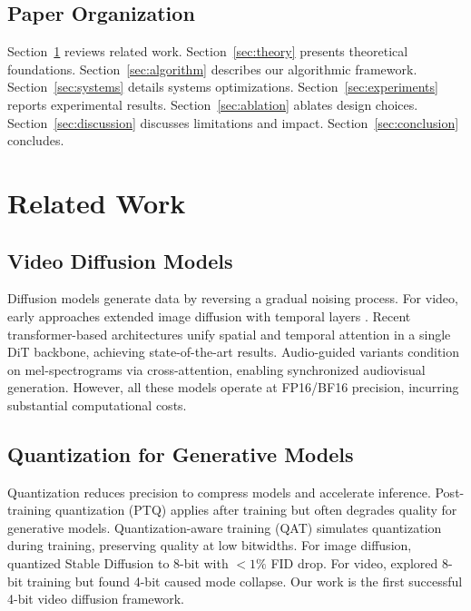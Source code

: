 \documentclass[journal]{IEEEtran}
\theoremstyle{definition}
\theoremstyle{remark}
\begin{document}
\subsection{Paper Organization}
Section~\ref{sec:related} reviews related work. Section~\ref{sec:theory} presents theoretical foundations. Section~\ref{sec:algorithm} describes our algorithmic framework. Section~\ref{sec:systems} details systems optimizations. Section~\ref{sec:experiments} reports experimental results. Section~\ref{sec:ablation} ablates design choices. Section~\ref{sec:discussion} discusses limitations and impact. Section~\ref{sec:conclusion} concludes.

\section{Related Work}
\label{sec:related}

\subsection{Video Diffusion Models}
Diffusion models \cite{ho2020denoising, song2021denoising} generate data by reversing a gradual noising process. For video, early approaches extended image diffusion with temporal layers \cite{ho2022video, yang2022latent}. Recent transformer-based architectures \cite{peebles2023scalable, ma2024latte} unify spatial and temporal attention in a single DiT backbone, achieving state-of-the-art results. Audio-guided variants \cite{zhu2023tune, guo2024audio} condition on mel-spectrograms via cross-attention, enabling synchronized audiovisual generation. However, all these models operate at FP16/BF16 precision, incurring substantial computational costs.

\subsection{Quantization for Generative Models}
Quantization reduces precision to compress models and accelerate inference. Post-training quantization (PTQ) \cite{bondarenko2024understanding, xiao2023smoothquant} applies after training but often degrades quality for generative models. Quantization-aware training (QAT) \cite{esser2020learned, liu2020lsq} simulates quantization during training, preserving quality at low bitwidths. For image diffusion, \cite{li2023efficientdm} quantized Stable Diffusion to 8-bit with $<1\%$ FID drop. For video, \cite{zhang2024videoquant} explored 8-bit training but found 4-bit caused mode collapse. Our work is the first successful 4-bit video diffusion framework.
\end{document}
